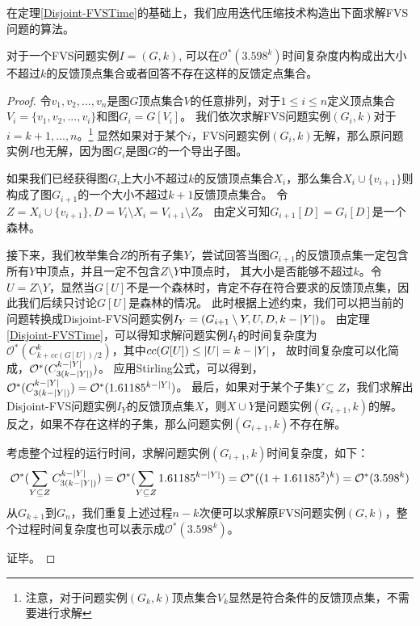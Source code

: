 在定理\ref{Disjoint-FVSTime}的基础上，我们应用迭代压缩技术构造出下面求解FVS问题的算法。
\begin{theorem}
对于一个FVS问题实例$I = (G, k)$, 可以在$\mathcal{O}^*(3.598^k)$时间复杂度内构成出大小不超过$k$的反馈顶点集合或者回答不存在这样的反馈定点集合。
\end{theorem}
\begin{proof}
令$v_1, v_2, ..., v_n$是图$G$顶点集合$V$的任意排列，对于$1 \le i \le n$定义顶点集合$V_i = \{v_1, v_2, ..., v_i\}$和图$G_i = G[V_i]$。
我们依次求解FVS问题实例$(G_i, k)$对于$i = k+1, ..., n$。\footnote{注意，对于问题实例$(G_k, k)$顶点集合$V_k$显然是符合条件的反馈顶点集，不需要进行求解}
显然如果对于某个$i$，FVS问题实例$(G_i, k)$无解，那么原问题实例$I$也无解，因为图$G_i$是图$G$的一个导出子图。

如果我们已经获得图$G_i$上大小不超过$k$的反馈顶点集合$X_i$，那么集合$X_i \cup \{v_{i+1}\}$则构成了图$G_{i+1}$的一个大小不超过$k+1$反馈顶点集合。
令$Z = X_i \cup \{v_{i+1}\}, D = V_i \setminus X_i = V_{i+1} \setminus Z$。
由定义可知$G_{i+1}[D] = G_i[D]$是一个森林。

接下来，我们枚举集合$Z$的所有子集$Y$，尝试回答当图$G_{i+1}$的反馈顶点集一定包含所有$Y$中顶点，并且一定不包含$Z \setminus Y$中顶点时，
其大小是否能够不超过$k$。令$U = Z \setminus Y$，显然当$G[U]$不是一个森林时，肯定不存在符合要求的反馈顶点集，因此我们后续只讨论$G[U]$是森林的情况。
此时根据上述约束，我们可以把当前的问题转换成Disjoint-FVS问题实例$I_Y = (G_{i+1} \setminus Y, U, D, k-\left\vert Y \right\vert)$。
由定理\ref{Disjoint-FVSTime}，可以得知求解问题实例$I_Y$的时间复杂度为$\mathcal{O}^*(C^k_{k + cc(G[U])/2})$，其中$cc(G[U]) \le \left\vert U \right\vert = k - \left\vert Y \right\vert$，
故时间复杂度可以化简成，$\mathcal{O}^*(C^{k - \left\vert Y \right\vert}_{3(k - \left\vert Y \right\vert)})$。
应用Stirling公式，可以得到，$\mathcal{O}^*(C^{k - \left\vert Y \right\vert}_{3(k - \left\vert Y \right\vert)}) = \mathcal{O}^*(1.61185^{k - \left\vert Y \right\vert})$。
最后，如果对于某个子集$Y \subseteq Z$，我们求解出Disjoint-FVS问题实例$I_Y$的反馈顶点集$X$，则$X \cup Y$是问题实例$(G_{i+1}, k)$的解。
反之，如果不存在这样的子集，那么问题实例$(G_{i+1}, k)$不存在解。

考虑整个过程的运行时间，求解问题实例$(G_{i+1}, k)$时间复杂度，如下：
\begin{equation*}
  \mathcal{O}^*(\sum_{Y \subseteq Z}C^{k - \left\vert Y \right\vert}_{3(k - \left\vert Y \right\vert)}) \\
   = \mathcal{O}^*(\sum_{Y \subseteq Z}1.61185^{k - \left\vert Y \right\vert})
   = \mathcal{O}^*((1 + 1.61185^2)^k) = \mathcal{O}^*(3.598^k)
\end{equation*}
从$G_{k+1}$到$G_n$，我们重复上述过程$n - k$次便可以求解原FVS问题实例$(G, k)$，整个过程时间复杂度也可以表示成$\mathcal{O}^*(3.598^k)$。

证毕。
\end{proof}
